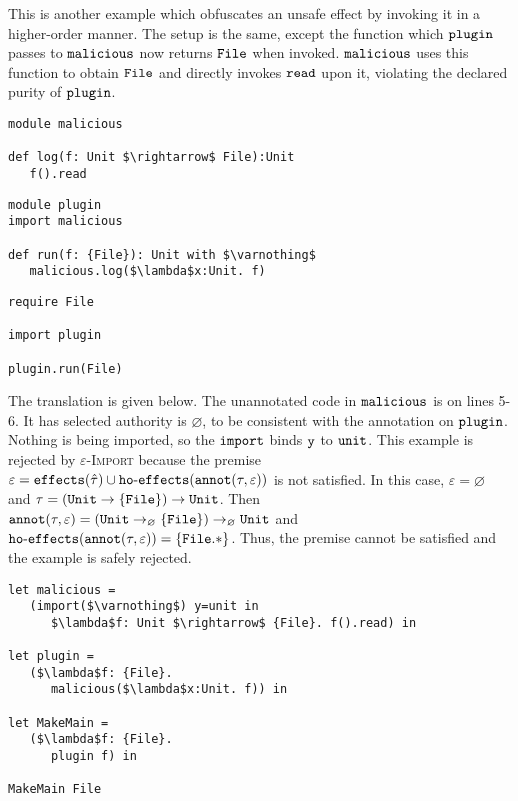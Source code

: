 This is another example which obfuscates an unsafe effect by invoking it in a higher-order manner. The setup is the same, except the function which $\mathtt{plugin}$ passes to $\mathtt{malicious}$ now returns $\mathtt{File}$ when invoked. $\mathtt{malicious}$ uses this function to obtain $\mathtt{File}$ and directly invokes $\mathtt{read}$ upon it, violating the declared purity of $\mathtt{plugin}$.

\begin{lstlisting}
module malicious

def log(f: Unit $\rightarrow$ File):Unit
   f().read
\end{lstlisting}

\begin{lstlisting}
module plugin
import malicious

def run(f: {File}): Unit with $\varnothing$
   malicious.log($\lambda$x:Unit. f)
\end{lstlisting}

\begin{lstlisting}
require File

import plugin

plugin.run(File)
\end{lstlisting}

The translation is given below. The unannotated code in $\mathtt{malicious}$ is on lines
5-6. It has selected authority is $\varnothing$, to be consistent with the annotation on
$\mathtt{plugin}$. Nothing is being imported, so the $\mathtt{import}$ binds $\mathtt{y}$ to
 $\mathtt{unit}$. This example is rejected by \textsc{$\varepsilon$-Import} because the
  premise $\varepsilon = \mathtt{effects}(\hat \tau) \cup \mathtt{ho \hbox{-} effects}(\mathtt{annot}(\tau, \varepsilon))$ is not satisfied. In this case, $\varepsilon = \varnothing$ and $\tau = \mathtt{ (Unit \rightarrow
\{ File \}) \rightarrow Unit }$. Then $\mathtt{annot}(\tau, \varepsilon) = \mathtt{ (Unit
\rightarrow_{\varnothing} \{ File \}) \rightarrow_{\varnothing} Unit }$ and
$\mathtt{ho \hbox{-} effects}(\mathtt{annot}(\tau, \varepsilon)) = \{ \mathtt{File.*} \}$. Thus, the premise cannot
be satisfied and the example is safely rejected.


\begin{lstlisting}
let malicious =
   (import($\varnothing$) y=unit in
      $\lambda$f: Unit $\rightarrow$ {File}. f().read) in

let plugin =
   ($\lambda$f: {File}.
      malicious($\lambda$x:Unit. f)) in

let MakeMain =
   ($\lambda$f: {File}.
      plugin f) in

MakeMain File
\end{lstlisting}